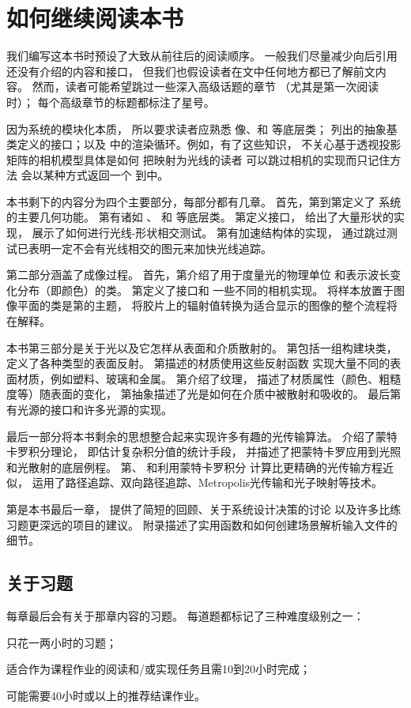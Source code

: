 \section{如何继续阅读本书}\label{sec:如何继续阅读本书}
我们编写这本书时预设了大致从前往后的阅读顺序。
一般我们尽量减少向后引用还没有介绍的内容和接口，
但我们也假设读者在文中任何地方都已了解前文内容。
然而，读者可能希望跳过一些深入高级话题的章节
（尤其是第一次阅读时）；
每个高级章节的标题都标注了星号。

因为系统的模块化本质，
所以要求读者应熟悉
像、和
等底层类；
列出的抽象基类定义的接口；以及
中的渲染循环。例如，有了这些知识，
不关心基于透视投影矩阵的相机模型具体是如何
把映射为光线的读者
可以跳过相机的实现而只记住方法
会以某种方式返回一个
到中。

本书剩下的内容分为四个主要部分，每部分都有几章。
首先，第到第定义了
系统的主要几何功能。
第有诸如
、
和
等底层类。
第定义接口，
给出了大量形状的实现，
展示了如何进行光线-形状相交测试。
第有加速结构体的实现，
通过跳过测试已表明一定不会有光线相交的图元来加快光线追踪。

第二部分涵盖了成像过程。
首先，第介绍了用于度量光的物理单位
和表示波长变化分布（即颜色）的类。
第定义了接口和
一些不同的相机实现。
将样本放置于图像平面的类是第的主题，
将胶片上的辐射值转换为适合显示的图像的整个流程将在解释。

本书第三部分是关于光以及它怎样从表面和介质散射的。
第包括一组构建块类，
定义了各种类型的表面反射。
第描述的材质使用这些反射函数
实现大量不同的表面材质，例如塑料、玻璃和金属。
第介绍了纹理，
描述了材质属性（颜色、粗糙度等）随表面的变化，
第抽象描述了光是如何在介质中被散射和吸收的。
最后第有光源的接口和许多光源的实现。

最后一部分将本书剩余的思想整合起来实现许多有趣的光传输算法。
介绍了蒙特卡罗积分理论，
即估计复杂积分值的统计手段，
并描述了把蒙特卡罗应用到光照和光散射的底层例程。
第、
和利用蒙特卡罗积分
计算比更精确的光传输方程近似，
运用了路径追踪、双向路径追踪、Metropolis光传输和光子映射等技术。

第是本书最后一章，
提供了简短的回顾、关于系统设计决策的讨论
以及许多比练习题更深远的项目的建议。
附录描述了实用函数和如何创建场景解析输入文件的细节。

\subsection{关于习题}\label{sub:关于习题}
每章最后会有关于那章内容的习题。
每道题都标记了三种难度级别之一：

\circleone 只花一两小时的习题；

\circletwo 适合作为课程作业的阅读和/或实现任务且需10到20小时完成；

\circlethree 可能需要40小时或以上的推荐结课作业。